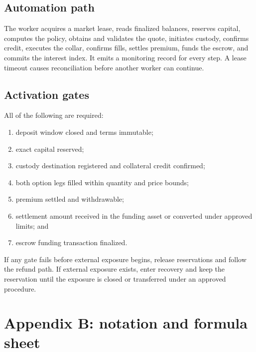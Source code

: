 \documentclass[11pt,oneside]{article}
\begin{document}
\subsection{Automation path}

The worker acquires a market lease, reads finalized balances, reserves capital, computes the policy, obtains and validates the quote, initiates custody, confirms credit, executes the collar, confirms fills, settles premium, funds the escrow, and commits the interest index. It emits a monitoring record for every step. A lease timeout causes reconciliation before another worker can continue.

\subsection{Activation gates}

All of the following are required:

\begin{enumerate}
\item deposit window closed and terms immutable;
\item exact capital reserved;
\item custody destination registered and collateral credit confirmed;
\item both option legs filled within quantity and price bounds;
\item premium settled and withdrawable;
\item settlement amount received in the funding asset or converted under approved limits; and
\item escrow funding transaction finalized.
\end{enumerate}

If any gate fails before external exposure begins, release reservations and follow the refund path. If external exposure exists, enter recovery and keep the reservation until the exposure is closed or transferred under an approved procedure.

\section{Appendix B: notation and formula sheet}
\end{document}
